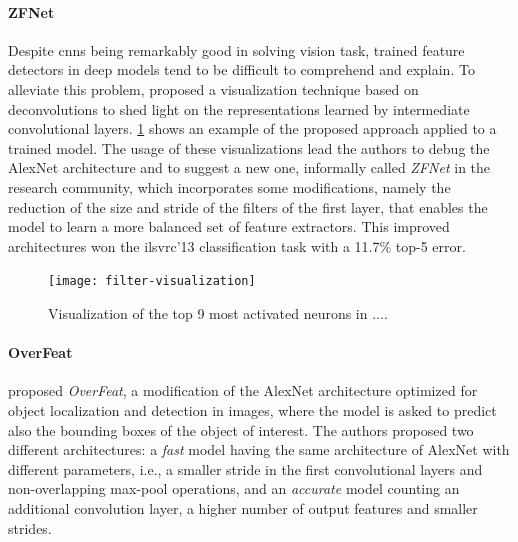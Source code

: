 \paragraph{ZFNet} Despite \glspl{cnn} being remarkably good in solving vision task,
trained feature detectors in deep models tend to be difficult to comprehend and explain.
To alleviate this problem, \citet{zeiler2014visualizing} proposed a visualization technique based on deconvolutions to shed light on the representations learned by intermediate convolutional layers.
\ref{fig:back:filter-visualization} shows an example of the proposed approach applied to a trained model.
The usage of these visualizations lead the authors to debug the AlexNet architecture and to suggest a new one, informally called \emph{ZFNet} in the research community, which incorporates some modifications, namely the reduction of the size and stride of the filters of the first layer, that enables the model to learn a more balanced set of feature extractors.
This improved architectures won the \gls{ilsvrc}'13 classification task with a 11.7\% top-5 error.

\begin{figure}
    \centering
    \texttt{[image: filter-visualization]}
    \caption{Visualization of the top 9 most activated neurons in ....}
    \label{fig:back:filter-visualization}
\end{figure}

\paragraph{OverFeat} \citet{sermanet2013overfeat} proposed \emph{OverFeat}, a modification of the AlexNet architecture optimized for object localization and detection in images, where the model is asked to predict also the bounding boxes of the object of interest.
The authors proposed two different architectures: a \emph{fast} model having the same architecture of AlexNet with different parameters, i.e., a smaller stride in the first convolutional layers and non-overlapping max-pool operations, and an \emph{accurate} model counting an additional convolution layer, a higher number of output features and smaller strides.

